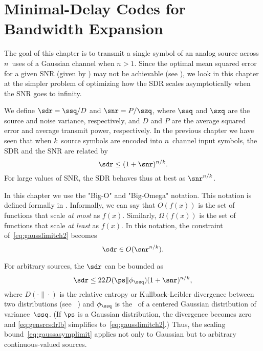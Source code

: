 \chapter{Minimal-Delay Codes for Bandwidth Expansion}\label{ch:mindelbwex}

The goal of this chapter is to transmit a single symbol of an analog source
across $n$~uses of a Gaussian channel when $n > 1$. Since the optimal mean squared
error for a given SNR (given by ) may not be
achievable (see ), we look in this chapter at the simpler
problem of optimizing how the SDR scales asymptotically when the SNR goes to
infinity. 

We define $\sdr = \ssq / D$ and $\snr = P / \szq$, where $\ssq$ and $\szq$ are
the source and noise variance, respectively, and $D$ and $P$ are the average
squared error and average transmit power, respectively. In the previous chapter
we have seen that when $k$~source symbols are encoded into $n$~channel input
symbols, the SDR and the SNR are related by
\begin{equation}
  \label{eq:gausslimitch2}
  \sdr \le (1 + \snr)^{n/k}.
\end{equation}
For large values of SNR, the SDR behaves thus at best as $\snr^{n/k}$.

In this chapter we use the "Big-O" and "Big-Omega" notation. This notation is
defined formally in . Informally, we can say that $O(f(x))$
is the set of functions that scale \emph{at most}  as $f(x)$. Similarly,
$\Omega(f(x))$ is the set of functions that scale \emph{at least} as $f(x)$. In
this notation, the constraint of~\eqref{eq:gausslimitch2} becomes
\begin{equation}
  \label{eq:gaussasymplimit}
  \sdr \in O(\snr^{n/k}).
\end{equation}

For arbitrary sources, the $\sdr$ can be bounded as
\begin{equation}
  \label{eq:gensrcsdrlb}
  \sdr \le 2{2 D(\ps \| \phi_{\ssq})} (1 + \snr)^{n/k},
\end{equation}
where $D(\cdot\|\cdot)$ is the relative entropy or Kullback-Leibler divergence
between two distributions (see \eg~\cite{CoverT1991}) and $\phi_{\ssq}$ is the
\pdf\ of a centered Gaussian distribution of variance~$\ssq$. (If $\ps$ is a
Gaussian distribution, the divergence becomes zero and \eqref{eq:gensrcsdrlb}
simplifies to~\eqref{eq:gausslimitch2}.) Thus, the scaling
bound~\eqref{eq:gaussasymplimit} applies not only to Gaussian but to arbitrary
continuous-valued sources.

